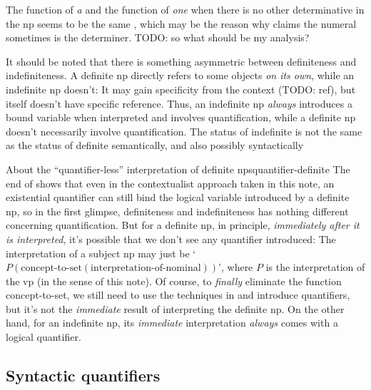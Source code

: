 \documentclass[UTF8, a4paper, oneside, scheme=plain]{ctexrep}
\newcommand*{\citepage}[1]{p.~{#1}}
\newcommand{\corpus}[1]{\emph{#1}}
\newcommand{\translate}[1]{`#1'}
\begin{document}
The function of \corpus{a} 
and the function of \corpus{one} when there is no other determinative in the \acs{np}
seems to be the same \citep[\citepage{372}]{cgel},
which may be the reason why \citet[\citepage{385}]{cgel} claims 
the numeral sometimes is the determiner. TODO: so what should be my analysis?

It should be noted that there is something asymmetric between definiteness and indefiniteness.
A definite \acs{np} directly refers to some objects \emph{on its own},
while an indefinite \acs{np} doesn't:
It may gain specificity from the context (TODO: ref), 
but itself doesn't have specific reference.
Thus, an indefinite \acs{np} \emph{always} introduces a bound variable when interpreted 
and involves quantification,
while a definite \acs{np} doesn't necessarily involve quantification.
The status of indefinite is not the same as the status of definite semantically,
and also possibly syntactically \citep{gianollo2021reference,klockmann2020article}

\begin{theorybox}{About the ``quantifier-less'' interpretation of definite \acs{np}s}{quantifier-definite}
    The end of 
    shows that even in the contextualist approach taken in this note,
    an existential quantifier can still bind the logical variable introduced by a definite \acs{np},
    so in the first glimpse, 
    definiteness and indefiniteness has nothing different concerning quantification.
    But for a definite \acs{np},
    in principle, 
    \emph{immediately after it is interpreted},
    it's possible that we don't see any quantifier introduced:
    The interpretation of a subject \acs{np} 
    may just be \translate{$P(\text{concept-to-set}(\text{interpretation-of-nominal}))$},
    where $P$ is the interpretation of the \acs{vp} (in the sense of this note).
    Of course, to \emph{finally} eliminate the function concept-to-set, 
    we still need to use the techniques in 
    and introduce quantifiers,
    but it's not the \emph{immediate} result of interpreting the definite \acs{np}.
    On the other hand, 
    for an indefinite \acs{np},
    its \emph{immediate} interpretation \emph{always} comes with a logical quantifier.
\end{theorybox}

\subsection{Syntactic quantifiers}\label{sec:np.det.quantifier}
\end{document}
